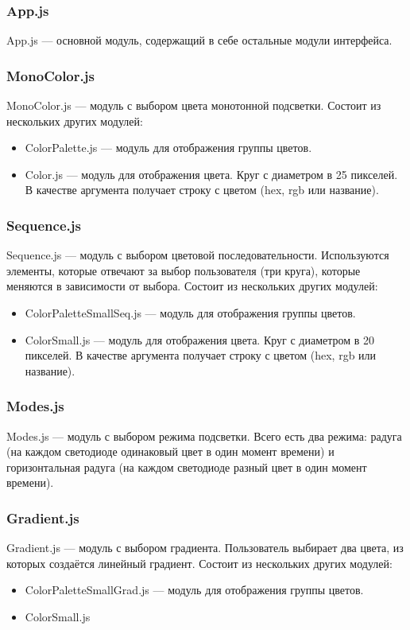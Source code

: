 \documentclass[hyperref={unicode}]{beamer}
\begin{document}
\begin{frame}
    \frametitle{App.js}
    App.js --- основной модуль, содержащий в себе остальные модули интерфейса.
\end{frame}

\begin{frame}
    \frametitle{MonoColor.js}
    MonoColor.js --- модуль с выбором цвета монотонной подсветки. Состоит из нескольких других модулей:
    \begin{itemize}
        \item ColorPalette.js --- модуль для отображения группы цветов.
        \item Color.js --- модуль для отображения цвета. Круг с диаметром в 25 пикселей. В качестве аргумента получает строку с цветом (hex, rgb или название). 
    \end{itemize}
\end{frame}

\begin{frame}
    \frametitle{Sequence.js}
    Sequence.js --- модуль с выбором цветовой последовательности. Используются элементы, которые отвечают за выбор пользователя (три круга), которые меняются в зависимости от выбора. Состоит из нескольких других модулей:
    \begin{itemize}
        \item ColorPaletteSmallSeq.js --- модуль для отображения группы цветов.
        \item ColorSmall.js --- модуль для отображения цвета. Круг с диаметром в 20 пикселей. В качестве аргумента получает строку с цветом (hex, rgb или название). 
    \end{itemize}
\end{frame}

\begin{frame}
    \frametitle{Modes.js}

    Modes.js --- модуль с выбором режима подсветки. Всего есть два режима: радуга (на каждом светодиоде одинаковый цвет в один момент времени) и горизонтальная радуга (на каждом светодиоде разный цвет в один момент времени).
\end{frame}

\begin{frame}
    \frametitle{Gradient.js}

    Gradient.js --- модуль с выбором градиента. Пользователь выбирает два цвета, из которых создаётся линейный градиент. Состоит из нескольких других модулей:
    \begin{itemize}
        \item ColorPaletteSmallGrad.js --- модуль для отображения группы цветов.
        \item ColorSmall.js 
    \end{itemize}
\end{frame}
\end{document}
